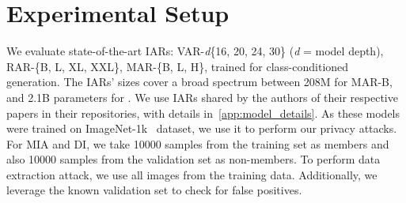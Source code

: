 \section{Experimental Setup}

We evaluate state-of-the-art IARs: VAR-\textit{d}\{16, 20, 24, 30\} (\textit{d} = model depth), RAR-\{B, L, XL, XXL\}, MAR-\{B, L, H\}, trained for class-conditioned generation. The IARs' sizes cover a broad spectrum between 208M for MAR-B, and 2.1B parameters for \varbig. We use IARs shared by the authors of their respective papers in their repositories, 
with details in~\cref{app:model_details}. As these models were trained on ImageNet-1k~\citep{deng2009imagenet} dataset, we use it to perform our privacy attacks. 
For MIA and DI, we take 10000 samples from the training set as members and also 10000 samples from the validation set as non-members. To perform data extraction attack, we use all images from the training data. Additionally, we leverage the known validation set to check for false positives.


